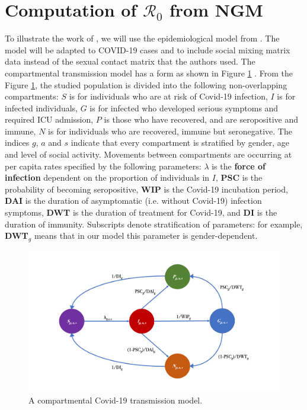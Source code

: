 \documentclass[12pt]{article}
\begin{document}
\section{Computation of $\mathcal{R}_{0}$ from NGM}
\label{sec:2}

To illustrate the work of \cite{Diekmann:2010}, we will use the epidemiological model from \cite{Gareth:2013}. The model will be adapted to COVID-19 cases and to include social mixing matrix data instead of the sexual contact matrix that the authors used. The compartmental transmission model has a form as shown in Figure \ref{fig:model} \cite[p.5]{Gareth:2013}. From the Figure \ref{fig:model}, the studied population is divided into the following non-overlapping compartments: $S$ is for individuals who are at risk of Covid-19 infection, $I$ is for infected individuals, $G$ is for infected who developed serious symptoms and required ICU admission, $P$ is those who have recovered, and are seropositive and immune, $N$ is for individuals who are recovered, immune but seronegative. The indices $g$, $a$ and $s$ indicate that every compartment is stratified by gender, age and level of social activity. Movements between compartments are occurring at per capita rates specified by the following parameters: $\lambda$ is the \textbf{force of infection} dependent on the proportion of individuals in $I$, \textbf{PSC} is the probability of becoming seropositive, \textbf{WIP} is the Covid-19 incubation period, \textbf{DAI} is the duration of asymptomatic (i.e. without Covid-19) infection symptoms, \textbf{DWT} is the duration of treatment for Covid-19, and \textbf{DI} is the duration of immunity. Subscripts denote stratification of parameters: for example, \textbf{DWT}$_{g}$ means that in our model this parameter is gender-dependent.

\begin{figure}[h!]
\centering
\includegraphics[width=1\textwidth]{COVIDb}
\caption{A compartmental Covid-19 transmission model.}
\label{fig:model}
\end{figure}
\end{document}
